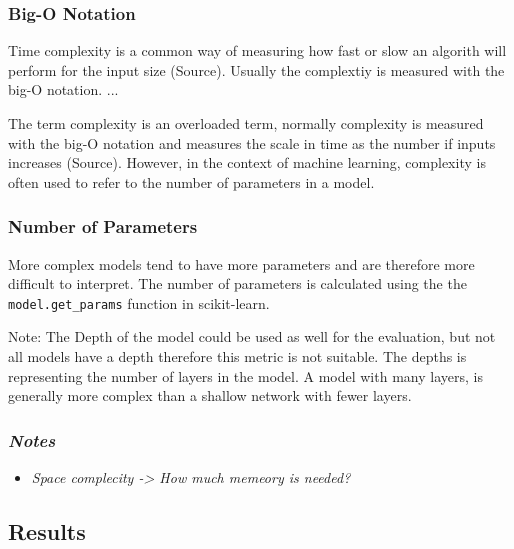 \subsubsection*{Big-O Notation}

Time complexity is a common way of measuring how fast or slow an algorith will perform for the
input size (Source). Usually the complextiy is measured with the big-O notation.
...

The term complexity is an overloaded term, normally complexity is measured with the big-O
notation and measures the scale in time as the number if inputs increases (Source).
However, in the context of machine learning, complexity is often used to refer to the
number of parameters in a model.

\subsubsection*{Number of Parameters}
More complex models tend to have more parameters and are therefore more difficult to interpret.
The number of parameters is calculated using the the \texttt{model.get\_params} function
in scikit-learn.

Note: The Depth of the model could be used as well for the evaluation, but not all models have a
depth therefore this metric is not suitable.
The depths is representing the number of layers in the model.
A model with many layers, is generally more complex than a shallow network with fewer layers.

\subsubsection*{\textit{Notes}}

\begin{itemize}
    \item \textit{Space complecity -> How much memeory is needed?}
\end{itemize}

\subsection{Results}\label{subsec:results2}

